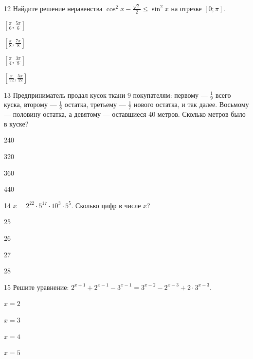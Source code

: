 \documentclass[14pt]{article}
\begin{document}
\begin{questionbox}{12}
    Найдите решение неравенства \(\cos^2 x - \frac{\sqrt{2}}{2} \le \sin^2 x\) на отрезке \([0; \pi]\).
    \begin{options}
        \item \(\left[\frac{\pi}{6}, \frac{5\pi}{6}\right]\)
        \item \(\left[\frac{\pi}{8}, \frac{7\pi}{8}\right]\)
        \item \(\left[\frac{\pi}{4}, \frac{3\pi}{8}\right]\)
        \item \(\left[\frac{\pi}{12}, \frac{5\pi}{12}\right]\)
    \end{options}
\end{questionbox}

\begin{questionbox}{13}
    Предприниматель продал кусок ткани 9 покупателям: первому — \(\frac{1}{9}\) всего куска, второму — \(\frac{1}{8}\) остатка, третьему — \(\frac{1}{7}\) нового остатка, и так далее. Восьмому — половину остатка, а девятому — оставшиеся 40 метров. Сколько метров было в куске?
    \begin{options}
        \item 240
        \item 320
        \item 360
        \item 440
    \end{options}
\end{questionbox}

\begin{questionbox}{14}
    \(x = 2^{22} \cdot 5^{17} \cdot 10^{3} \cdot 5^{5}\). Сколько цифр в числе \(x\)?
    \begin{options}
        \item 25
        \item 26
        \item 27
        \item 28
    \end{options}
\end{questionbox}

\begin{questionbox}{15}
    Решите уравнение: \(2^{x+1} + 2^{x-1} - 3^{x-1} = 3^{x-2} - 2^{x-3} + 2 \cdot 3^{x-3}\).
    \begin{options}
        \item \(x = 2\)
        \item \(x = 3\)
        \item \(x = 4\)
        \item \(x = 5\)
    \end{options}
\end{questionbox}
\end{document}
